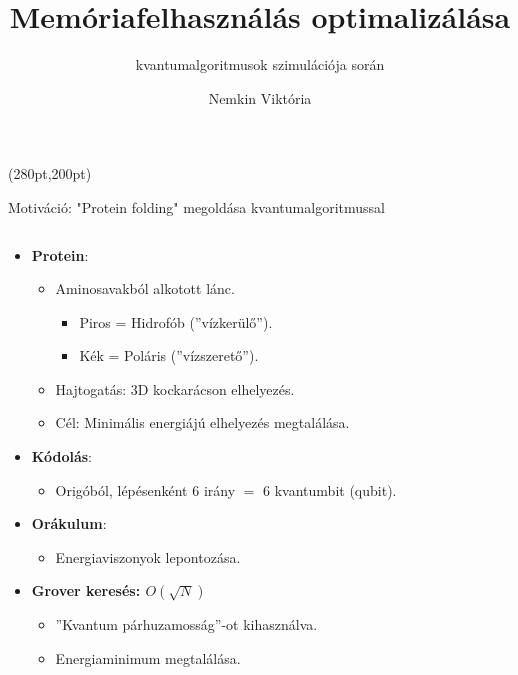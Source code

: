\documentclass[aspectratio=169]{beamer}
\author[Nemkin Viktória]{Nemkin Viktória}
\institute[]{
\begin{small}dr. Friedl Katalin\end{small}\\
\begin{footnotesize}Számítástudományi és Információelméleti Tanszék\end{footnotesize}
}
\title{Memóriafelhasználás optimalizálása}
\subtitle{kvantumalgoritmusok szimulációja során}
\date{}
\begin{document}
\begin{frame}
\titlepage

\begin{textblock*}{150pt}(280pt,200pt) %

\end{textblock*}
\end{frame}


\begin{frame}{Motiváció: "Protein folding" megoldása kvantumalgoritmussal}
\begin{columns}
\begin{column}{0.55\textwidth}
\begin{itemize}
    \item \textbf{Protein}:
    \begin{itemize}
        \item Aminosavakból alkotott lánc.
        \begin{itemize}
          \item \color{red} Piros = Hidrofób (''vízkerülő'').
          \item \color{blue} Kék = Poláris (''vízszerető'').
        \end{itemize}
        \item Hajtogatás: 3D kockarácson elhelyezés.
        \item Cél: Minimális energiájú elhelyezés megtalálása.
    \end{itemize}
    \item \textbf{Kódolás}:
    \begin{itemize}
        \item Origóból, lépésenként $6$ irány $=$ $6$ kvantumbit (qubit).
    \end{itemize}
    \item \textbf{Orákulum}: 
    \begin{itemize}
        \item Energiaviszonyok lepontozása.
    \end{itemize}
    \item \textbf{Grover keresés: $O(\sqrt{N})$}
    \begin{itemize}
        \item ''Kvantum párhuzamosság''-ot kihasználva.
        \item Energiaminimum megtalálása.
    \end{itemize}
\end{itemize}
\end{column}
\begin{column}{0.45\textwidth}

\end{column}
\end{columns}
\end{frame}
\end{document}
